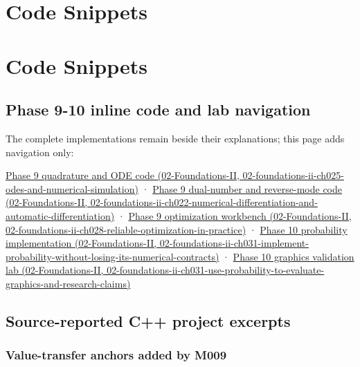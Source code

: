 \hypertarget{appendix-4e2236f53445}{}
\section*{Code Snippets}
\section{Code Snippets}\label{appendix-4e2236f53445-code-snippets}

\subsection{Phase 9-10 inline code and lab navigation}\label{appendix-4e2236f53445-phase-9-10-inline-code-and-lab-navigation}

The complete implementations remain beside their explanations; this page adds navigation only:

\href{../02-Foundations-II/main.pdf\#nameddest=02-foundations-ii-ch025-odes-and-numerical-simulation}{Phase 9 quadrature and ODE code (02-Foundations-II, 02-foundations-ii-ch025-odes-and-numerical-simulation)} · \href{../02-Foundations-II/main.pdf\#nameddest=02-foundations-ii-ch022-numerical-differentiation-and-automatic-differentiation}{Phase 9 dual-number and reverse-mode code (02-Foundations-II, 02-foundations-ii-ch022-numerical-differentiation-and-automatic-differentiation)} · \href{../02-Foundations-II/main.pdf\#nameddest=02-foundations-ii-ch028-reliable-optimization-in-practice}{Phase 9 optimization workbench (02-Foundations-II, 02-foundations-ii-ch028-reliable-optimization-in-practice)} · \href{../02-Foundations-II/main.pdf\#nameddest=02-foundations-ii-ch031-implement-probability-without-losing-its-numerical-contracts}{Phase 10 probability implementation (02-Foundations-II, 02-foundations-ii-ch031-implement-probability-without-losing-its-numerical-contracts)} · \href{../02-Foundations-II/main.pdf\#nameddest=02-foundations-ii-ch031-use-probability-to-evaluate-graphics-and-research-claims}{Phase 10 graphics validation lab (02-Foundations-II, 02-foundations-ii-ch031-use-probability-to-evaluate-graphics-and-research-claims)}

\subsection{Source-reported C++ project excerpts}\label{appendix-4e2236f53445-source-reported-c-project-excerpts}

\subsubsection{Value-transfer anchors added by M009}\label{appendix-4e2236f53445-value-transfer-anchors-added-by-m009}

